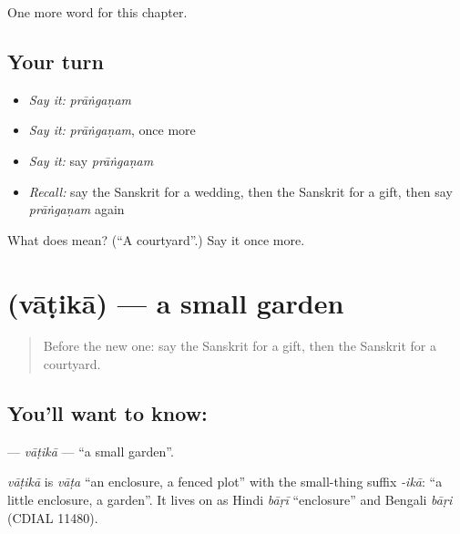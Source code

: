 \begin{grammarlens}[title={What you've built}]
One more word for this chapter.
\end{grammarlens}

\subsection*{Your turn}
\begin{itemize}
\raggedright
  \item \emph{Say it:} \emph{prāṅgaṇam}
  \item \emph{Say it:} \emph{prāṅgaṇam}, once more
  \item \emph{Say it:} say \emph{prāṅgaṇam}
  \item \emph{Recall:} say the Sanskrit for a wedding, then the Sanskrit for a gift, then say \emph{prāṅgaṇam} again
\end{itemize}

\begin{tcolorbox}[breakable,colback=teal!4,colframe=teal!35!black,title={Before you move on}]
What does  mean? (\textquotedblleft{}A courtyard\textquotedblright{}.) Say it once more.
\end{tcolorbox}
\section[\texorpdfstring{\sk{वाटिका} (vāṭikā)}{वाटिका (vāṭikā)}]{ (vāṭikā) — a small garden}

\label{lesson:SA-C164-vatika}



\begin{quote}
Before the new one: say the Sanskrit for a gift, then the Sanskrit for a courtyard.
\end{quote}

\subsection*{You'll want to know: }
\textbf{} — \emph{vāṭikā} — \textquotedblleft{}a small garden\textquotedblright{}.

\begin{cousinweb}
\emph{vāṭikā} is \emph{vāṭa} \textquotedblleft{}an enclosure, a fenced plot\textquotedblright{} with the small-thing suffix \emph{-ikā}: \textquotedblleft{}a little enclosure, a garden\textquotedblright{}. It lives on as Hindi \emph{bāṛī} \textquotedblleft{}enclosure\textquotedblright{} and Bengali \emph{bāṛi} (CDIAL 11480).
\end{cousinweb}

